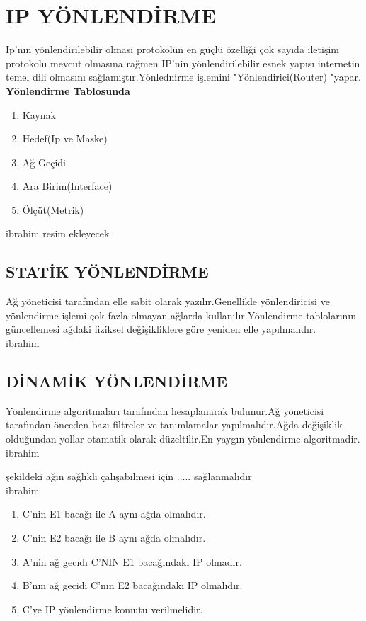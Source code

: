 \section{IP YÖNLENDİRME}

Ip'nın yönlendirilebilir olmasi protokolün  en güçlü özelliği çok sayıda iletişim protokolu mevcut olmasına rağmen IP'nin yönlendirilebilir esnek yapısı internetin temel dili olmasını sağlamıştır.Yönlednirme işlemini "Yönlendirici(Router) "yapar.
\textbf{Yönlendirme Tablosunda}\\
\begin{enumerate}[label=\alph*)] 
   \item Kaynak
   \item Hedef(Ip ve Maske)
   \item Ağ Geçidi
   \item Ara Birim(Interface)
   \item Ölçüt(Metrik)
\end{enumerate}

   ibrahim  resim ekleyecek
\subsection{STATİK YÖNLENDİRME}
Ağ yöneticisi tarafından elle sabit olarak yazılır.Genellikle yönlendiricisi ve yönlendirme işlemi çok fazla olmayan ağlarda kullanılır.Yönlendirme tablolarının güncellemesi ağdaki fiziksel değişikliklere göre yeniden elle yapılmalıdır.\\
ibrahim
\subsection{DİNAMİK YÖNLENDİRME}
Yönlendirme algoritmaları  tarafından hesaplanarak bulunur.Ağ yöneticisi tarafından önceden bazı filtreler ve tanımlamalar yapılmalıdır.Ağda değişiklik olduğundan yollar otamatik olarak düzeltilir.En yaygın yönlendirme algoritmadir.\\
ibrahim

şekildeki ağın sağlıklı çalışabılmesi için  ..... sağlanmalıdır\\
ibrahim
\begin{enumerate}
   \item C'nin E1 bacağı ile A aynı ağda olmalıdır.
   \item  C'nin E2 bacağı ile B aynı ağda olmalıdır.
   \item  A'nin ağ gecıdı C'NIN E1 bacağındakı IP olmadır.
   \item  B'nın ağ gecidi C'nın E2 bacağındakı IP olmalıdır.
   \item C'ye IP yönlendirme komutu verilmelidir.
\end{enumerate}

